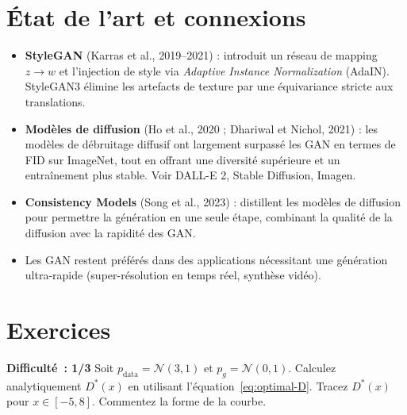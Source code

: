 \section{\'Etat de l'art et connexions}
\label{sec:gan-sota}

\begin{sota}[title=\textbf{Au-del\`a des GAN classiques}]
\begin{itemize}
    \item \textbf{StyleGAN} (Karras et al., 2019--2021) : introduit un r\'eseau de mapping $z \to w$ et l'injection de style via \emph{Adaptive Instance Normalization} (AdaIN). StyleGAN3 \'elimine les artefacts de texture par une \'equivariance stricte aux translations.

    \item \textbf{Mod\`eles de diffusion} (Ho et al., 2020 ; Dhariwal et Nichol, 2021) : les mod\`eles de d\'ebruitage diffusif ont largement surpass\'e les GAN en termes de FID sur ImageNet, tout en offrant une diversit\'e sup\'erieure et un entra\^inement plus stable. Voir DALL-E 2, Stable Diffusion, Imagen.

    \item \textbf{Consistency Models} (Song et al., 2023) : distillent les mod\`eles de diffusion pour permettre la g\'en\'eration en une seule \'etape, combinant la qualit\'e de la diffusion avec la rapidit\'e des GAN.

    \item Les GAN restent pr\'ef\'er\'es dans des applications n\'ecessitant une g\'en\'eration ultra-rapide (super-r\'esolution en temps r\'eel, synth\`ese vid\'eo).
\end{itemize}
\end{sota}

\section{Exercices}
\label{sec:gan-exercices}

\begin{exercice}
\label{exo:optimal-disc}
\textbf{Difficult\'e~: 1/3}
Soit $p_{\text{data}} = \mathcal{N}(3, 1)$ et $p_g = \mathcal{N}(0, 1)$. Calculez analytiquement $D^*(x)$ en utilisant l'\'equation~\eqref{eq:optimal-D}. Tracez $D^*(x)$ pour $x \in [-5, 8]$. Commentez la forme de la courbe.
\end{exercice}

